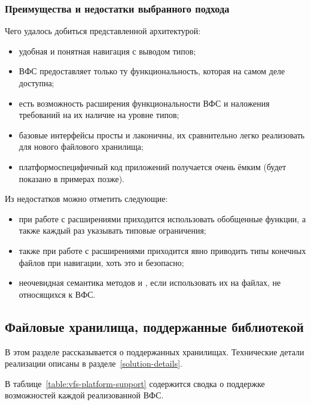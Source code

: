  \subsubsection{Преимущества и недостатки выбранного подхода}
    Чего удалось добиться представленной архитектурой:
    \begin{itemize}
      \item удобная и понятная навигация с выводом типов;
      \item ВФС предоставляет только ту функциональность, которая на самом деле доступна;
      \item есть возможность расширения функциональности ВФС и наложения требований на их наличие на уровне типов;
      \item базовые интерфейсы просты и лаконичны, их сравнительно легко реализовать для нового файлового хранилища;
      \item платформоспецифичный код приложений получается очень ёмким (будет показано в примерах позже).
    \end{itemize}
    Из недостатков можно отметить следующие:
    \begin{itemize}
      \item при работе с расширениями приходится использовать обобщенные функции, а также каждый раз указывать типовые ограничения;
      \item также при работе с расширениями приходится явно приводить типы конечных файлов при навигации, хоть это и безопасно;
      \item неочевидная семантика методов  и , если использовать их на файлах, не относящихся к ВФС.
    \end{itemize}


\subsection{Файловые хранилища, поддержанные библиотекой}
  В этом разделе рассказывается о поддержанных хранилищах. Технические детали реализации описаны в разделе~\ref{solution-details}.
  
  В таблице~\ref{table:vfs-platform-support} содержится сводка о поддержке возможностей каждой реализованной ВФС.

